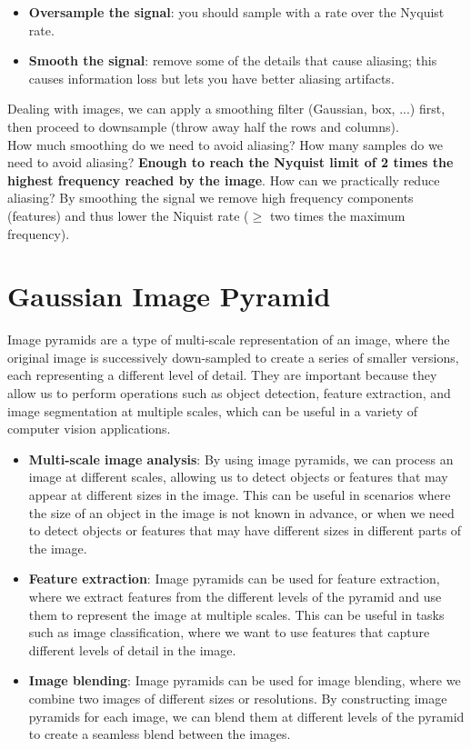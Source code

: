 \documentclass{article}
\begin{document}
\begin{itemize}
    \item \textbf{Oversample the signal}: you should sample with a rate over the Nyquist rate.
    \item \textbf{Smooth the signal}: remove some of the details that cause aliasing; this causes information loss but lets you have better aliasing artifacts. 
\end{itemize}

Dealing with images, we can apply a smoothing filter (Gaussian, box, ...) first, then proceed to downsample (throw away half the rows and columns). \\

How much smoothing do we need to avoid aliasing? How many samples do we need to avoid aliasing? \textbf{Enough to reach the Nyquist limit of 2 times the highest frequency reached by the image}. How can we practically reduce aliasing? By smoothing the signal we remove high frequency components (features) and thus lower the Niquist rate ($\geq$ two times the maximum frequency).

\newpage

\section*{Gaussian Image Pyramid}

Image pyramids are a type of multi-scale representation of an image, where the original image is successively down-sampled to create a series of smaller versions, each representing a different level of detail. They are important because they allow us to perform operations such as object detection, feature extraction, and image segmentation at multiple scales, which can be useful in a variety of computer vision applications.

\begin{itemize}
    \item \textbf{Multi-scale image analysis}: By using image pyramids, we can process an image at different scales, allowing us to detect objects or features that may appear at different sizes in the image. This can be useful in scenarios where the size of an object in the image is not known in advance, or when we need to detect objects or features that may have different sizes in different parts of the image.
    \item \textbf{Feature extraction}: Image pyramids can be used for feature extraction, where we extract features from the different levels of the pyramid and use them to represent the image at multiple scales. This can be useful in tasks such as image classification, where we want to use features that capture different levels of detail in the image.
    \item \textbf{Image blending}: Image pyramids can be used for image blending, where we combine two images of different sizes or resolutions. By constructing image pyramids for each image, we can blend them at different levels of the pyramid to create a seamless blend between the images.
\end{itemize}
\end{document}
